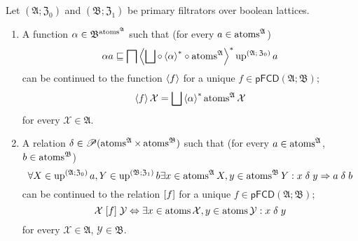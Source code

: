 \begin{thm}
\label{pf-atom-cont}Let $(\mathfrak{A};\mathfrak{Z}_{0})$ and $(\mathfrak{B};\mathfrak{Z}_{1})$
be primary filtrators over boolean lattices.
\begin{enumerate}
\item \label{pf-at-f}A function $\alpha\in\mathfrak{B}^{\operatorname{atoms}^{\mathfrak{A}}}$
such that (for every $a\in\operatorname{atoms}^{\mathfrak{A}}$)
\begin{equation}
\alpha a\sqsubseteq\bigsqcap\left\langle \bigsqcup\circ\left\langle \alpha\right\rangle ^{\ast}\circ\operatorname{atoms}^{\mathfrak{A}}\right\rangle ^{\ast}\operatorname{up}^{\text{\ensuremath{(\mathfrak{A};\mathfrak{Z}_{0})}}}a\label{pf-alpha-a-greater}
\end{equation}
can be continued to the function $\left\langle f\right\rangle$ for a unique $f\in\mathsf{pFCD}(\mathfrak{A};\mathfrak{B})$;
\begin{equation}
\left\langle f\right\rangle\mathcal{X}=\bigsqcup\left\langle \alpha\right\rangle ^{\ast}\operatorname{atoms}^{\mathfrak{A}}\mathcal{X}\label{pf-atoms-fun-cont}
\end{equation}
for every $\mathcal{X}\in\mathfrak{A}$.
\item \label{pf-at-r}A relation $\delta\in\mathscr{P}(\operatorname{atoms}^{\mathfrak{A}}\times\operatorname{atoms}^{\mathfrak{B}})$
such that (for every $a\in\operatorname{atoms}^{\mathfrak{A}}$, $b\in\operatorname{atoms}^{\mathfrak{B}}$)
\begin{equation}
\forall X\in\operatorname{up}^{(\mathfrak{A};\mathfrak{Z}_{0})}a,Y\in\operatorname{up}^{(\mathfrak{B};\mathfrak{Z}_{1})}b\exists x\in\operatorname{atoms}^{\mathfrak{A}}X,y\in\operatorname{atoms}^{\mathfrak{B}}Y:x\mathrel{\delta}y\Rightarrow a\mathrel{\delta}b\label{pf-atoms-delta}
\end{equation}
can be continued to the relation $\mathrel{\left[f\right]}$ for a unique $f\in\mathsf{pFCD}(\mathfrak{A};\mathfrak{B})$;
\begin{equation}
\mathcal{X}\mathrel{\left[f\right]}\mathcal{Y}\Leftrightarrow\exists x\in\operatorname{atoms}\mathcal{X},y\in\operatorname{atoms}\mathcal{Y}:x\mathrel{\delta}y\label{pf-atoms-rel-cont}
\end{equation}
for every $\mathcal{X}\in\mathfrak{A}$, $\mathcal{Y}\in\mathfrak{B}$.
\end{enumerate}
\end{thm}
